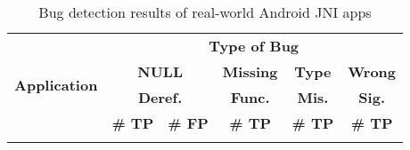 \begin{table}[t]
  \vspace{2mm}
  \caption{Bug detection results of real-world Android JNI apps}
  \label{table:RQ3}
  \vspace*{-1em}
  \centering
  \small
  \begin{tabular}{l||r|r|r|r|r} 
    \multirow{4}{*}{\textbf{Application}} & \multicolumn{5}{c}{\textbf{Type of Bug}} \\\hhline{~||-----}
                                          & \multicolumn{2}{c|}{\textbf{NULL}}   & \multicolumn{1}{c|}{\textbf{Missing}} & \multicolumn{1}{c|}{\textbf{Type}} & \multicolumn{1}{c}{\textbf{Wrong}} \\\hhline{~||~|~|~|~|~}
                                          & \multicolumn{2}{c|}{\textbf{Deref.}} & \multicolumn{1}{c|}{\textbf{Func.}} & \multicolumn{1}{c|}{\textbf{Mis.}} & \multicolumn{1}{c}{\textbf{\textbf{Sig.}}}  \\\hhline{~||-|-|-|-|-}
                                          & \multicolumn{1}{c|}{\textbf{\# TP}}   & \multicolumn{1}{c|}{\textbf{\# FP}} & \multicolumn{1}{c|}{\textbf{\# TP}} & \multicolumn{1}{c|}{\textbf{\# TP}} & \multicolumn{1}{c}{\textbf{\textbf{\# TP}}}  \\\hhline{=#=|=|=|=|=}


\end{tabular}
\end{table}
